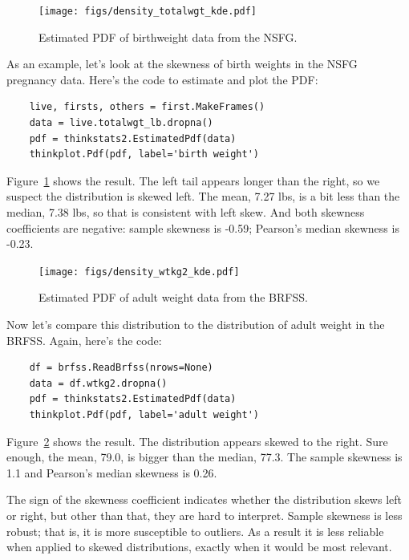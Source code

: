 \documentclass[12pt]{book}
\theoremstyle{exercise}
\begin{document}
\begin{figure}
\centerline{\texttt{[image: figs/density\_totalwgt\_kde.pdf]}}
\caption{Estimated PDF of birthweight data from the NSFG.}%
\label{density_totalwgt_kde}
\end{figure}

As an example, let's look at the skewness of birth weights in the
NSFG pregnancy data.  Here's the code to estimate and plot the PDF:%

\begin{verbatim}
    live, firsts, others = first.MakeFrames()
    data = live.totalwgt_lb.dropna()
    pdf = thinkstats2.EstimatedPdf(data)
    thinkplot.Pdf(pdf, label='birth weight')
\end{verbatim}

Figure~\ref{density_totalwgt_kde} shows the result.  The left tail appears
longer than the right, so we suspect the distribution is skewed left.
The mean, 7.27 lbs, is a bit less than
the median, 7.38 lbs, so that is consistent with left skew.
And both skewness coefficients are negative:
sample skewness is -0.59;
Pearson's median skewness is -0.23.%
%
%

\begin{figure}
\centerline{\texttt{[image: figs/density\_wtkg2\_kde.pdf]}}
\caption{Estimated PDF of adult weight data from the BRFSS.}%
\label{density_wtkg2_kde}
\end{figure}

Now let's compare this distribution to the distribution of adult
weight in the BRFSS.  Again, here's the code:%

\begin{verbatim}
    df = brfss.ReadBrfss(nrows=None)
    data = df.wtkg2.dropna()
    pdf = thinkstats2.EstimatedPdf(data)
    thinkplot.Pdf(pdf, label='adult weight')
\end{verbatim}

Figure~\ref{density_wtkg2_kde} shows the result.  The distribution
appears skewed to the right.  Sure enough, the mean, 79.0, is bigger
than the median, 77.3.  The sample skewness is 1.1 and Pearson's
median skewness is 0.26.%
%

The sign of the skewness coefficient indicates whether the distribution
skews left or right, but other than that, they are hard to interpret.
Sample skewness is less robust; that is, it is more
susceptible to outliers.  As a result it is less reliable
when applied to skewed distributions, exactly when it would be most
relevant.%
%
\end{document}
